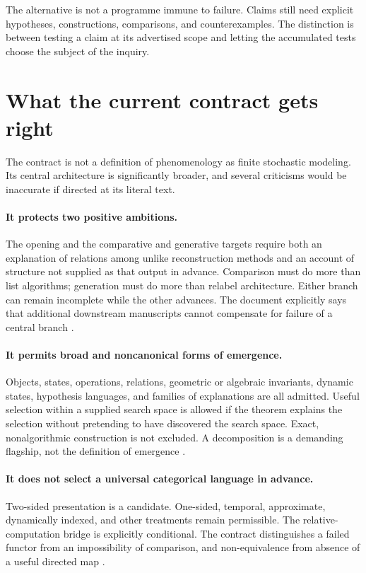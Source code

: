 \documentclass[11pt]{article}
\begin{document}
The alternative is not a programme immune to failure. Claims still need explicit hypotheses, constructions, comparisons, and counterexamples. The distinction is between testing a claim at its advertised scope and letting the accumulated tests choose the subject of the inquiry.

\section{What the current contract gets right}
\label{sec:protections}

The contract is not a definition of phenomenology as finite stochastic modeling. Its central architecture is significantly broader, and several criticisms would be inaccurate if directed at its literal text.

\paragraph{It protects two positive ambitions.}
The opening and the comparative and generative targets require both an explanation of relations among unlike reconstruction methods and an account of structure not supplied as that output in advance. Comparison must do more than list algorithms; generation must do more than relabel architecture. Either branch can remain incomplete while the other advances. The document explicitly says that additional downstream manuscripts cannot compensate for failure of a central branch \cite[sections on the proposed direction, central targets, and decision gates]{Contract}.

\paragraph{It permits broad and noncanonical forms of emergence.}
Objects, states, operations, relations, geometric or algebraic invariants, dynamic states, hypothesis languages, and families of explanations are all admitted. Useful selection within a supplied search space is allowed if the theorem explains the selection without pretending to have discovered the search space. Exact, nonalgorithmic construction is not excluded. A decomposition is a demanding flagship, not the definition of emergence \cite[the generative target and the flagship subsection]{Contract}.

\paragraph{It does not select a universal categorical language in advance.}
Two-sided presentation is a candidate. One-sided, temporal, approximate, dynamically indexed, and other treatments remain permissible. The relative-computation bridge is explicitly conditional. The contract distinguishes a failed functor from an impossibility of comparison, and non-equivalence from absence of a useful directed map \cite[the proposed direction, comparison semantics, and relative-computation bridge]{Contract}.
\end{document}
